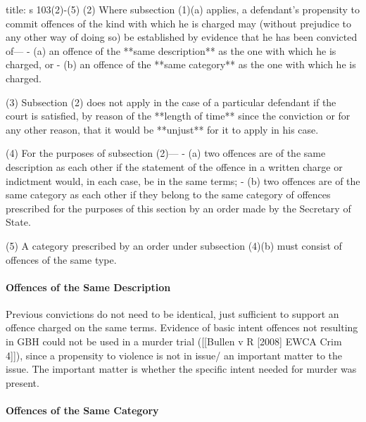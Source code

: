 \documentclass[
]{article}
\newenvironment{Shaded}{}{}
\newcommand{\NormalTok}[1]{#1}
\begin{document}
\begin{Shaded}
\begin{Highlighting}[]
\NormalTok{title: s 103(2){-}(5)}
\NormalTok{(2) Where subsection (1)(a) applies, a defendant’s propensity to commit offences of the kind with which he is charged may (without prejudice to any other way of doing so) be established by evidence that he has been convicted of—}
\NormalTok{{-} (a) an offence of the **same description** as the one with which he is charged, or}
\NormalTok{{-} (b) an offence of the **same category** as the one with which he is charged.}

\NormalTok{(3) Subsection (2) does not apply in the case of a particular defendant if the court is satisfied, by reason of the **length of time** since the conviction or for any other reason, that it would be **unjust** for it to apply in his case.}

\NormalTok{(4) For the purposes of subsection (2)—}
\NormalTok{{-} (a) two offences are of the same description as each other if the statement of the offence in a written charge or indictment would, in each case, be in the same terms;}
\NormalTok{{-} (b) two offences are of the same category as each other if they belong to the same category of offences prescribed for the purposes of this section by an order made by the Secretary of State.}

\NormalTok{(5) A category prescribed by an order under subsection (4)(b) must consist of offences of the same type.}
\end{Highlighting}
\end{Shaded}

\hypertarget{offences-of-the-same-description}{%
\paragraph{Offences of the Same
Description}\label{offences-of-the-same-description}}

Previous convictions do not need to be identical, just sufficient to
support an offence charged on the same terms. Evidence of basic intent
offences not resulting in GBH could not be used in a murder trial
({[}{[}Bullen v R {[}2008{]} EWCA Crim 4{]}{]}), since a propensity to
violence is not in issue/ an important matter to the issue. The
important matter is whether the specific intent needed for murder was
present.

\hypertarget{offences-of-the-same-category}{%
\paragraph{Offences of the Same
Category}\label{offences-of-the-same-category}}
\end{document}
